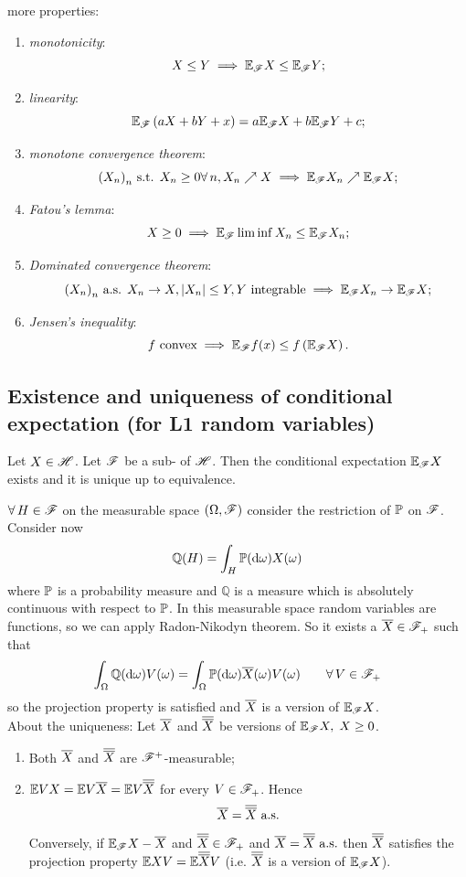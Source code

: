 \documentclass{report}
\begin{document}
more properties:
\begin{enumerate}[\circnum]
	\item \emph{monotonicity}:
	\[X\leq Y\implies\mathbb{E}_{\mathscr{F}} X\leq\mathbb{E}_{\mathscr{F}} Y;\]
	\item \emph{linearity}:
	\[\mathbb{E}_{\mathscr{F}}\left(aX+bY+x\right)=a\mathbb{E}_{\mathscr{F}} X+b\mathbb{E}_{\mathscr{F}} Y+c;\]
	\item \emph{monotone convergence theorem}:
	\[{(X_{n})}_{n}\text{ s.t. }X_{n}\geq 0\forall\, n,X_n\nearrow X\implies\mathbb{E}_{\mathscr{F}} X_n\nearrow\mathbb{E}_{\mathscr{F}} X;\]
	\item \emph{Fatou's lemma}:
	\[X\geq0\implies \mathbb{E}_{\mathscr{F}}\liminf X_n\leq\mathbb{E}_{\mathscr{F}} X_n;\]
	\item \emph{Dominated convergence theorem}:
	\[{(X_{n})}_{n}\text{ a.s. }X_n\to X,|X_n|\leq Y,Y\text{ integrable}\implies\mathbb{E}_{\mathscr{F}} X_n\to\mathbb{E}_{\mathscr{F}} X;\]
	\item \emph{Jensen's inequality}:
	\[f\text{ convex}\implies \mathbb{E}_{\mathscr{F}} f(x)\leq f\left(\mathbb{E}_{\mathscr{F}} X\right).\]
\end{enumerate}
\subsection{Existence and uniqueness of conditional expectation (for L1 random variables)}
\begin{theorem}
	Let $X\in\mathscr{H}$. Let $\mathscr{F}$ be a sub-\sa{} of $\mathscr{H}$. Then the conditional expectation $\mathbb{E}_{\mathscr{F}} X$ exists and it is unique up to equivalence.
\end{theorem}
\begin{fancyproof}
	$\forall\, H\in\mathscr{F}$ on the measurable space $(\Omega,\mathscr{F})$ consider the restriction of $\mathbb{P}$ on $\mathscr{F}$. Consider now
	\[\mathbb{Q}(H)=\int_H\mathbb{P}(\mathop{}\!\mathrm{d}\omega)X(\omega)\]
	where $\mathbb{P}$ is a probability measure and $\mathbb{Q}$ is a measure which is absolutely continuous with respect to $\mathbb{P}$. In this measurable space random variables are functions, so we can apply Radon-Nikodyn theorem. So it exists a \rv{} $\overline{X}\in\mathscr{F}_{+}$ such that
	\begin{equation*}
		\int_{\Omega}\mathbb{Q}(\mathop{}\!\mathrm{d}\omega)V(\omega)=\int_{\Omega}\mathbb{P}(\mathop{}\!\mathrm{d}\omega)\overline{X}(\omega)V(\omega)\qquad\forall\, V\in\mathscr{F}_{+}
	\end{equation*}
	so the projection property is satisfied and $\overline{X}$ is a version of $\mathbb{E}_{\mathscr{F}} X$.\\
	About the uniqueness:
	Let $\overline{X}$ and $\overline{\overline{X}}$ be versions of $\mathbb{E}_{\mathscr{F}}X,\;X\geq 0$.
	\begin{enumerate}
		\item Both $\overline{X}$ and $\overline{\overline{X}}$ are $\mathscr{F}^{+}$-measurable;
		\item $\mathbb{E} VX=\mathbb{E} V\overline{X}=\mathbb{E} V\overline{\overline{X}}$ for every $V\in\mathscr{F}_{+}$. Hence 
		\[\overline{X}=\overline{\overline{X}}\text{ a.s.}\]
		Conversely, if $\mathbb{E}_{\mathscr{F}}X-\overline{X}$ and $\overline{\overline{X}}\in\mathscr{F}_+$ and $\overline{X}=\overline{\overline{X}}\text{ a.s.}$ then $\overline{\overline{X}}$ satisfies the projection property $\mathbb{E} XV=\mathbb{E}\overline{\overline{X}} V$ (i.e. $\overline{\overline{X}}$ is a version of $\mathbb{E}_{\mathscr{F}} X$).
	\end{enumerate}
\end{fancyproof}
\end{document}
